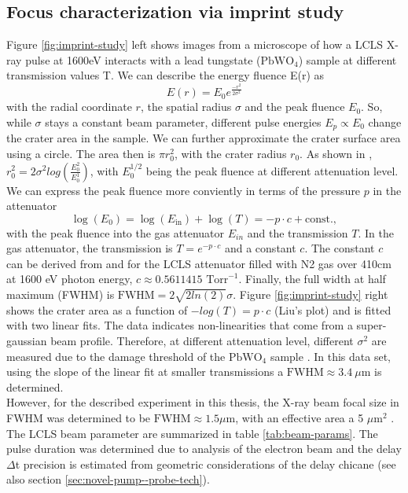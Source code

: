 \subsection{Focus characterization via imprint study}
Figure \ref{fig:imprint-study} left shows images from a microscope of how a LCLS X-ray pulse at 1600eV interacts with a lead tungstate ($\text{PbWO}_{4}$) sample at different transmission values T. We can describe the energy fluence E(r) as
\begin{equation}
E(r) = E_{0} e^{\frac{-r^{2}}{2 \sigma^{2}}} 
\end{equation}
with the radial coordinate $r$, the spatial radius $\sigma$ and the peak fluence $E_{0}$. So, while $\sigma$ stays a constant beam parameter, different pulse energies $E_{p}\propto E_{0}$ change the crater area in the sample. We can further approximate the crater surface area using a circle. The area then is $\pi r_{0}^{2}$, with the crater radius $r_{0}$. As shown in \citep{Liu-1982-OptLett}, $r_{0}^{2}=2\sigma^{2}log(\frac{E_{0}^{2}}{E_{0}^{1}})$, with $E_{0}^{1/2}$ being the peak fluence at different attenuation level. We can express the peak fluence more conviently in terms of the pressure $p$ in the attenuator
\begin{equation}
\log(E_{0}) = \log(E_{\text{in}})+\log(T)= -p \cdot c + \text{const.},
\label{eq:gaussian-beam-imprint}
\end{equation}
with the peak fluence into the gas attenuator $E_{in}$ and the transmission $T$. In the gas attenuator, the transmission is $T=e^{-p \cdot c}$ and a constant $c$. The constant $c$ can be derived from \citep{Henke-1993-ADNDT} and for the LCLS attenuator filled with N2 gas over 410cm at 1600 eV photon energy, $c\approx 0.5611415 \text{ Torr}^{-1}$. Finally, the full width at half maximum (FWHM) is $\text{FWHM}=2\sqrt{2 ln(2)}\sigma$. Figure \ref{fig:imprint-study} right shows the crater area as a function of $-log(T)= p \cdot c$ (Liu's plot) and is fitted with two linear fits. The data indicates non-linearities that come from a super-gaussian beam profile. Therefore, at different attenuation level, different $\sigma^{2}$ are measured due to the damage threshold of the $\text{PbWO}_{4}$ sample \citep{Chalupsky-2010-OE,Chalupsky-2013-OE}. In this data set, using the slope of the linear fit at smaller transmissions a $\text{FWHM}\approx 3.4\ \mu$m is determined.\\ 
However, for the described experiment in this thesis, the X-ray beam focal size in FWHM was determined to be $\text{FWHM}\approx 1.5\mu$m, with an effective area a 5 $\mu\text{m}^2$ \citep{Bucher-2016-Unpublished}. The LCLS beam parameter are summarized in table \ref{tab:beam-params}. The pulse duration was determined due to analysis of the electron beam and the delay $\Delta$t precision is estimated from geometric considerations of the delay chicane (see also section \ref{sec:novel-pump--probe-tech}).
